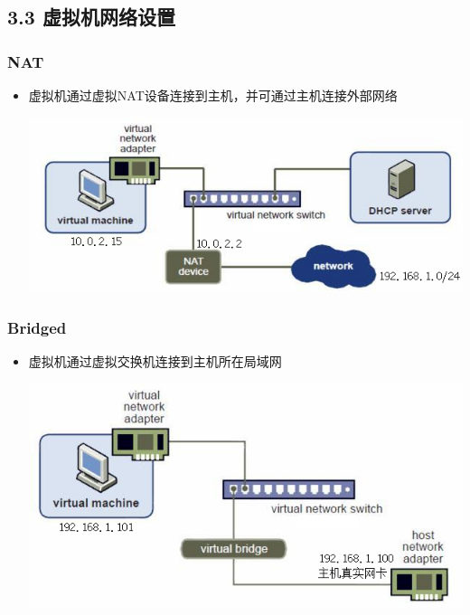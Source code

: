 \documentclass[xcolor=svgnames,presentation]{beamer}
\begin{document}
\subsection{3.3 虚拟机网络设置}
\label{sec-3-3}
\begin{frame}
\frametitle{NAT}
\label{sec-3-3-1}
\begin{itemize}

\item 虚拟机通过虚拟NAT设备连接到主机，并可通过主机连接外部网络
\label{sec-3-3-1-1}%
\begin{center}
\includegraphics[width=.9\linewidth]{img/nat.jpg}
\end{center}

\end{itemize} %
\end{frame}
\begin{frame}
\frametitle{Bridged}
\label{sec-3-3-2}
\begin{itemize}

\item 虚拟机通过虚拟交换机连接到主机所在局域网
\label{sec-3-3-2-1}%
\begin{center}
\includegraphics[width=.9\linewidth]{img/bridged.jpg}
\end{center}

\end{itemize} %
\end{frame}
\end{document}
